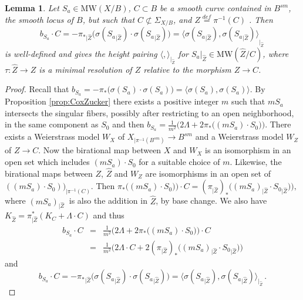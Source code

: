 \documentclass[11pt]{amsart}
\newtheorem{lemma}[theorem]{Lemma}
\theoremstyle{definition}
\theoremstyle{definition}
\theoremstyle{remark}
\theoremstyle{remark}
\theoremstyle{definition}
\theoremstyle{conjecture}
\newcommand{\MW}{\mathrm{MW}}
\begin{document}
\begin{lemma}\label{lemma:bsaZ}
Let $S_a \in \MW(X/B)$, $ C \subset B $  be a smooth curve contained in $B^{sm}$, the smooth locus of $B$, but such that $ C \not \subset\Sigma_{X/B}$,  and $ Z \stackrel{def}= \pi^{-1}(C)$  . %
Then
\[
 b_{S_a} \cdot C= -{\pi_\ast}_{|\widehat Z}\bigl(\sigma ({S_a}_{|\widehat Z}) \cdot  \sigma({S_a}_{|\widehat Z}) \bigr) = {\langle \sigma ({S_a}_{|\widehat Z}) , \sigma({S_a}_{|\widehat Z})\rangle}_{|_{\widehat Z}}\,
\]
is  well-defined and gives the height pairing $\langle,\rangle_{|_{\widehat Z}}$ for $S_a|_{\widehat Z}\in \MW({\widehat Z}/C)$, where  $ \tau: \widehat Z \to Z$ is a minimal resolution  of $Z$ relative to the morphism $Z \to C$.
\end{lemma}


\begin{proof} 
Recall that $ b_{S_a}
   = -\pi_*   \bigl( \sigma(S_a) \cdot  \sigma(S_a)  \bigr) = \langle  \sigma(S_a),  \sigma(S_a) \rangle.$
  By Proposition \ref{prop:CoxZucker} there exists a positive integer $m$ such that 
$mS_a$ intersects the singular fibers, possibly after restricting to an open neighborhood,  in the same component as $S_0$ and then $ b_{S_a}
    = \frac{1}{m^2}\Big(2 \Lambda + 2\pi_*\bigl((mS_a)\cdot S_0\bigr)\Big)
  $. There exists a Weierstrass model $W_X$ of $X_{|\pi^{-1}(B^{sm})} \to B^{sm}$ and   a Weierstrass model $W_Z$ of $Z\to C$. Now the birational map between $X$ and $W_X$ is an isomorphism in an open set which includes $(mS_a)\cdot S_0$ for a suitable choice of $m$. Likewise, the birational maps between $Z$, $\widehat Z$ and $W_Z$ are isomorphisms in an open set of $((mS_a)\cdot S_0))_{|\pi^{-1}(C)}$. Then 
$\pi_*\bigl((mS_a)\cdot S_0\bigr)\bigr)\cdot C=(\pi_{|\widehat Z})_*\bigl((mS_a)_{|\widehat Z}\cdot {S_0}_{|\widehat Z}\bigr)\Big),$  where  $(mS_a)_{|\widehat Z} \ $ is also the addition in $\widehat Z$, {by base change}. We also have  $K_{\widehat Z}= \pi_{|\widehat Z}^*(K_C+ \Lambda \cdot C)$ and thus
\begin{eqnarray} b_{S_a} \cdot C
   & =& \frac{1}{m^2}\Big(2 \Lambda + 2\pi_*\bigl((mS_a)\cdot S_0\bigr)\Big)\cdot C \nonumber \\
   &=& \frac{1}{m^2}\Big(2 \Lambda \cdot C + 2(\pi_{|\widehat Z})_*\bigl((mS_a)_{|\widehat Z}\cdot {S_0}_{|\widehat Z}\bigr)\Big) \nonumber
\end{eqnarray}
and 
 \[ b_{S_a} \cdot C = -{\pi_\ast}_{|\widehat Z}\bigl(\sigma ({S_a}_{|\widehat Z}) \cdot  \sigma({S_a}_{|\widehat Z}) \bigr) = \langle \sigma ({S_a}_{|\widehat Z}) , \sigma({S_a}_{|\widehat Z})\rangle_{|_{\widehat Z}} \,.
 \]\end{proof}
\end{document}
